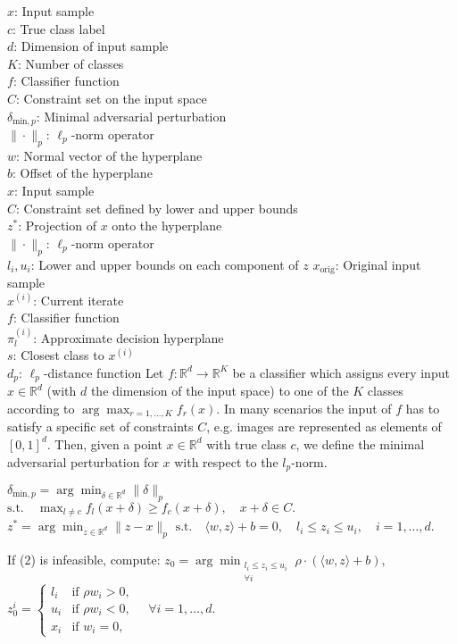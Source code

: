 $x$: Input sample \\
$c$: True class label \\
$d$: Dimension of input sample \\
$K$: Number of classes \\
$f$: Classifier function \\
$C$: Constraint set on the input space \\
$\delta_{\text{min},p}$: Minimal adversarial perturbation \\
$\|\cdot\|_p$: $\ell_p$-norm operator\\
$w$: Normal vector of the hyperplane \\
$b$: Offset of the hyperplane \\
$x$: Input sample \\
$C$: Constraint set defined by lower and upper bounds \\
$z^*$: Projection of $x$ onto the hyperplane \\
$\|\cdot\|_p$: $\ell_p$-norm operator \\
$l_i, u_i$: Lower and upper bounds on each component of $z$
$x_{\text{orig}}$: Original input sample \\
$x^{(i)}$: Current iterate \\
$f$: Classifier function \\
$\pi_l^{(i)}$: Approximate decision hyperplane \\
$s$: Closest class to $x^{(i)}$ \\
$d_p$: $\ell_p$-distance function
Let $f : \mathbb{R}^d \to \mathbb{R}^K$ be a classifier which assigns every input $x \in \mathbb{R}^d$ (with $d$ the dimension of the input space) to one of the $K$ classes according to $\arg \max_{r=1,...,K} f_r(x)$. In many scenarios the input of $f$ has to satisfy a specific set of constraints $C$, e.g. images are represented as elements of $[0, 1]^d$. Then, given a point $x \in \mathbb{R}^d$ with true class $c$, we define the minimal adversarial perturbation for $x$ with respect to the $l_p$-norm.


$\delta_{\text{min},p} = \arg \min_{\delta \in \mathbb{R}^d} \|\delta\|_p$
$\text{s.t.} \quad \max_{l \neq c} f_l(x + \delta) \geq f_c(x + \delta), \quad x + \delta \in C.$
$z^* = \arg \min_{z \in \mathbb{R}^d} \|z - x\|_p$
$\text{s.t.} \quad \langle w, z \rangle + b = 0, \quad l_i \leq z_i \leq u_i, \quad i = 1, \dots, d.$

If (2) is infeasible, compute:
$z_0 = \arg \min_{\substack{l_i \leq z_i \leq u_i \\ \forall i}} \rho \cdot (\langle w, z \rangle + b),$
$z_0^i = \begin{cases} 
l_i & \text{if } \rho w_i > 0, \\
u_i & \text{if } \rho w_i < 0, \\
x_i & \text{if } w_i = 0,
\end{cases}
\quad \forall i = 1, \dots, d.$

